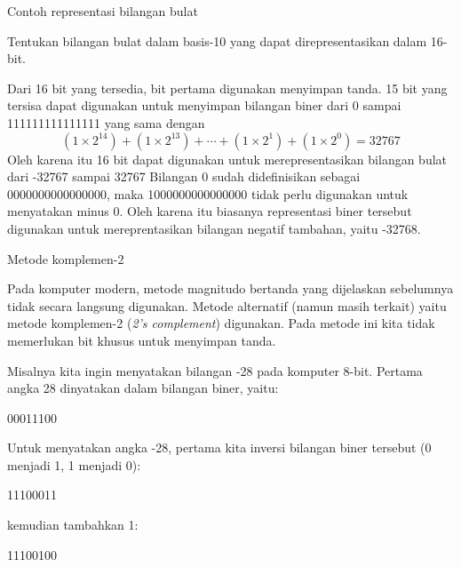 \begin{frame}{Contoh representasi bilangan bulat}

Tentukan bilangan bulat dalam basis-10 yang dapat direpresentasikan dalam 16-bit.

Dari 16 bit yang tersedia, bit pertama digunakan menyimpan tanda.
15 bit yang tersisa dapat digunakan untuk menyimpan bilangan biner
dari 0 sampai 111111111111111 yang sama dengan
$$
(1 \times 2^{14}) + (1 \times 2^{13}) + \cdots +
(1 \times 2^{1}) + (1 \times 2^{0}) = 32767
$$
Oleh karena itu 16 bit dapat digunakan untuk merepresentasikan bilangan bulat
dari -32767 sampai 32767
Bilangan 0 sudah didefinisikan sebagai 0000000000000000, maka
1000000000000000 tidak perlu digunakan untuk menyatakan minus 0. Oleh karena itu
biasanya representasi biner tersebut digunakan untuk mereprentasikan bilangan
negatif tambahan, yaitu -32768.

\end{frame}



\begin{frame}[fragile]{Metode komplemen-2}

Pada komputer modern, metode magnitudo bertanda yang dijelaskan sebelumnya
tidak secara langsung digunakan. Metode alternatif (namun masih terkait)
yaitu metode komplemen-2 (\textit{2's complement}) digunakan. Pada metode ini
kita tidak memerlukan bit khusus untuk menyimpan tanda.

Misalnya kita ingin menyatakan bilangan -28 pada komputer 8-bit.
Pertama angka 28 dinyatakan dalam bilangan biner, yaitu:
\begin{textcode}
00011100
\end{textcode}
Untuk menyatakan angka -28, pertama kita inversi bilangan biner tersebut
(0 menjadi 1, 1 menjadi 0):
\begin{textcode}
11100011
\end{textcode}
kemudian tambahkan 1:
\begin{textcode}
11100100
\end{textcode}

\end{frame}



